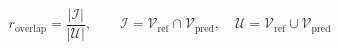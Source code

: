 \documentclass[12pt]{article}
\begin{document}
\begin{equation*}
r_{\text{overlap}} = \frac{|\mathcal{I}|}{|\mathcal{U}|}, \qquad \mathcal{I} = \mathcal{V}_{\text{ref}} \cap \mathcal{V}_{\text{pred}}, \quad \mathcal{U} = \mathcal{V}_{\text{ref}} \cup \mathcal{V}_{\text{pred}}
\end{equation*}
\end{document}
